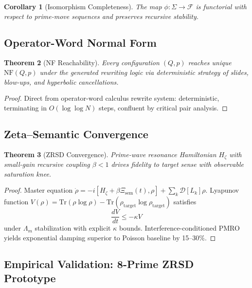 \documentclass[11pt,a4paper]{article}
\theoremstyle{plain}
\newtheorem{theorem}{Theorem}[section]
\newtheorem{corollary}[theorem]{Corollary}
\theoremstyle{definition}
\theoremstyle{remark}
\begin{document}
\begin{corollary}[Isomorphism Completeness]
The map \(\phi: \Sigma \to \mathcal{F}\) is functorial with respect to prime-move sequences and preserves recursive stability.
\end{corollary}

\subsection{Operator-Word Normal Form}

\begin{theorem}[NF Reachability]\label{thm:nf}
Every configuration \((Q,p)\) reaches unique \(\text{NF}(Q,p)\) under the generated rewriting logic via deterministic strategy of slides, blow-ups, and hyperbolic cancellations.
\end{theorem}

\begin{proof}
Direct from operator-word calculus rewrite system: deterministic, terminating in \(O(\log \log N)\) steps, confluent by critical pair analysis.
\end{proof}

\subsection{Zeta--Semantic Convergence}

\begin{theorem}[ZRSD Convergence]\label{thm:zrsd}
Prime-wave resonance Hamiltonian \(H_\zeta\) with small-gain recursive coupling \(\beta < 1\) drives fidelity to target sense with observable saturation knee.
\end{theorem}

\begin{proof}
Master equation \(\dot{\rho} = -i[H_\zeta + \beta \Xi_{\text{sem}}(t), \rho] + \sum_k \mathcal{D}[L_k]\rho\). Lyapunov function \(V(\rho) = \text{Tr}(\rho \log \rho) - \text{Tr}(\rho_{\text{target}} \log \rho_{\text{target}})\) satisfies
\[
\frac{dV}{dt} \leq -\kappa V
\]
under \(\Lambda_m\) stabilization with explicit \(\kappa\) bounds. Interference-conditioned PMRO yields exponential damping superior to Poisson baseline by 15--30\%.
\end{proof}

\subsection{Empirical Validation: 8-Prime ZRSD Prototype}
\end{document}
